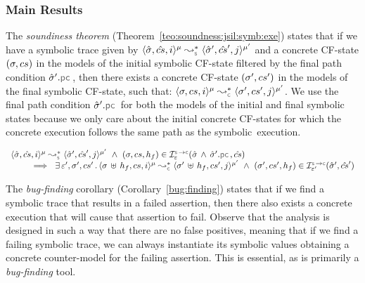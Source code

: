  


\subsubsection{Main Results}
The \emph{soundiness theorem} (Theorem~\ref{teo:soundness:jsil:symb:exe}) states that if we have a symbolic trace given by 
$\transabssemrule{\sstate, \scs, i}{\sstate', \scs', j}{\mode}{\mode'}{\symbolic}$ and a concrete CF-state $(\sigma, cs)$
in the models of the initial symbolic CF-state filtered by the final path condition $\sstate'.\pcsel$,  
then there exists a concrete CF-state $(\sigma', cs')$ in the models of the final symbolic CF-state, such that: 
$\transabssemrule{\jstate, \cs, i}{\jstate', \cs', j}{\mode}{\mode'}{\concrete}$. 
We use the final path condition $\sstate'.\pcsel$ for both the models of the initial and final 
symbolic states because we only care about the initial concrete CF-states for which 
the concrete execution follows the same path as the symbolic~execution. 

\begin{theorem}[Soundiness]\label{teo:soundness:jsil:symb:exe}
$$
\begin{array}{l}
\transabssemrule{\sstate, \scs, i}{\sstate', \scs', j}{\mode}{\mode'}{\symbolic}  \ \wedge \ (\jstate, \cs, \heap_f) \in \interpret{\symbconc}{\senv}(\sstate \, \wedge \, \sstate'.\pcsel, \scs) \\ \quad \quad 
    \ \implies \ \exists \, \senv', \jstate', \cs' \, . \, 
        \transabssemrule{\jstate \dunion \heap_f, \cs, i}{\jstate' \dunion \heap_f, \cs', j}{\mode}{\mode'}{\concrete}
               \ \wedge \ (\jstate', \cs', \heap_f) \in \interpret{\symbconc}{\senv'}(\sstate', \scs')
\end{array}
$$
\end{theorem}

The \emph{bug-finding} corollary (Corollary~\ref{bug:finding}) states that if 
we find a symbolic trace that results in a failed assertion, 
then there also exists a concrete execution that will cause that assertion to fail.
Observe that the analysis is designed in such a way that there are no false positives, 
meaning that if we find a failing symbolic trace,
we can always instantiate its symbolic values obtaining a concrete counter-model for the 
failing assertion. This is essential, as \cosette is primarily a \emph{bug-finding} tool.


